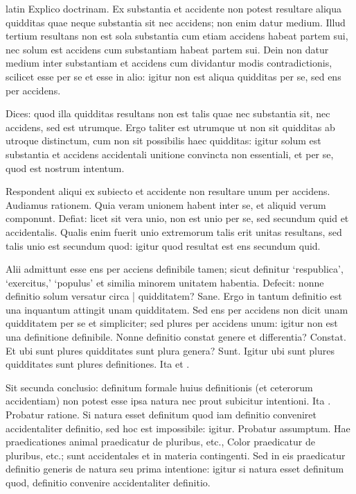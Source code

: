 \begin{otherlanguage*}{latin}
\pstart
Explico doctrinam. Ex substantia et accidente non potest resultare aliqua quidditas quae neque substantia sit nec accidens; non enim datur medium. Illud tertium resultans non est sola substantia cum etiam accidens habeat partem sui, nec solum est accidens cum substantiam habeat partem sui. Dein non datur medium inter substantiam et accidens cum dividantur modis contradictionis, scilicet esse per se et esse in alio:
igitur non est aliqua quidditas per se, sed ens per accidens. 
\pend

\pstart
Dices:
quod illa quidditas resultans non est talis quae nec substantia sit, nec accidens, sed est utrumque. Ergo taliter est utrumque ut non sit quidditas ab utroque distinctum, cum non sit possibilis haec quidditas:
igitur solum est substantia et accidens accidentali unitione convincta non essentiali, et per se, quod est nostrum intentum. 
\pend

\pstart
Respondent aliqui ex subiecto et accidente non resultare unum per accidens. Audiamus rationem. Quia veram unionem habent inter se, et aliquid verum componunt. Defiat:
licet sit vera unio, non est unio per se, sed secundum quid et accidentalis. Qualis enim fuerit unio extremorum talis erit unitas resultans, sed talis unio est secundum quod:
igitur quod resultat est ens secundum quid. 
\pend

\pstart
Alii admittunt esse ens per acciens definibile tamen; sicut definitur `respublica', `exercitus,' `populus' et similia minorem unitatem habentia. Defecit:
nonne definitio solum versatur circa \textnormal{|} quidditatem? Sane. Ergo in tantum definitio est una inquantum attingit unam quidditatem. Sed ens per accidens non dicit unam quidditatem per se et simpliciter; sed plures per accidens unum:
igitur non est una definitione definibile. Nonne definitio constat genere et differentia? Constat. Et ubi sunt plures quidditates sunt plura genera? Sunt. Igitur ubi sunt plures quidditates sunt plures definitiones. Ita  et . 
\pend

\pstart
Sit secunda conclusio:
definitum formale huius definitionis (et ceterorum accidentiam) non potest esse ipsa natura nec prout subicitur intentioni. Ita . Probatur ratione. Si natura esset definitum quod iam definitio conveniret accidentaliter definitio, sed hoc est impossibile:
igitur. Probatur assumptum. Hae praedicationes animal praedicatur de pluribus, etc., Color praedicatur de pluribus, etc.; sunt accidentales et in materia contingenti. Sed in eis praedicatur definitio generis de natura seu prima intentione:
igitur si natura esset definitum quod, definitio convenire accidentaliter definitio. 
\pend


\end{otherlanguage*}
